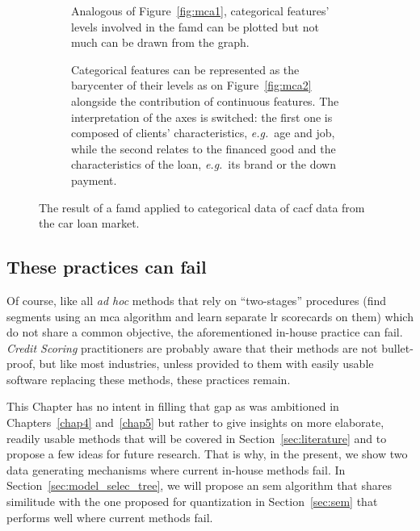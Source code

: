 \begin{figure}[!htb]
{\setlength{\parindent}{0cm}}

\begin{multicols}{2}
\centering
\begin{subfigure}[t]{0.45\textwidth}
\centering
\resizebox{\textwidth}{!}{}
\caption{\label{fig:famd1} Analogous of Figure~\ref{fig:mca1}, categorical features' levels involved in the \gls{famd} can be plotted but not much can be drawn from the graph.}
\end{subfigure}%
\columnbreak
\hspace*{1cm} \begin{subfigure}[t]{0.45\textwidth}
\centering
\resizebox{\textwidth}{!}{}
\caption{\label{fig:famd2} Categorical features can be represented as the barycenter of their levels as on Figure~\ref{fig:mca2} alongside the contribution of continuous features. The interpretation of the axes is switched: the first one is composed of clients' characteristics, \textit{e.g.}\ age and job, while the second relates to the financed good and the characteristics of the loan, \textit{e.g.}\ its brand or the down payment.}
\end{subfigure}
\end{multicols}

\caption{\label{fig:famd} The result of a \gls{famd} applied to categorical data of \gls{cacf} data from the car loan market.}
\end{figure}

\subsection{These practices can fail} \label{subsec:fail}

Of course, like all \textit{ad hoc} methods that rely on ``two-stages'' procedures (find segments using an \gls{mca} algorithm and learn separate \gls{lr} scorecards on them) which do not share a common objective, the aforementioned in-house practice can fail. \textit{Credit Scoring} practitioners are probably aware that their methods are not bullet-proof, but like most industries, unless provided to them with easily usable software replacing these methods, these practices remain.

This Chapter has no intent in filling that gap as was ambitioned in Chapters~\ref{chap4} and~\ref{chap5} but rather to give insights on more elaborate, readily usable methods that will be covered in Section~\ref{sec:literature} and to propose a few ideas for future research. That is why, in the present, we show two data generating mechanisms where current in-house methods fail. In Section~\ref{sec:model_selec_tree}, we will propose an \gls{sem} algorithm that shares similitude with the one proposed for quantization in Section~\ref{sec:sem} that performs well where current methods fail.


